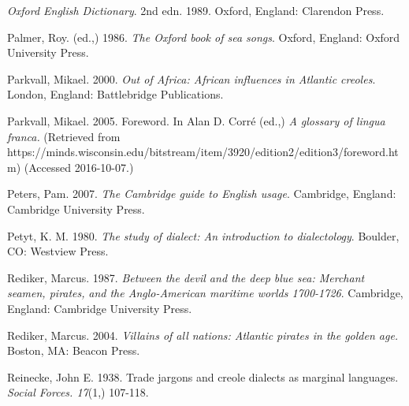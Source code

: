 \begin{styleStandard}
\textit{Oxford English Dictionary}. 2nd edn. 1989. Oxford, England: Clarendon Press. 
\end{styleStandard}

\begin{styleStandard}
Palmer, Roy. (ed.,) 1986. \textit{The Oxford book of sea songs}. Oxford, England: Oxford University Press. 
\end{styleStandard}

\begin{styleStandard}
Parkvall, Mikael. 2000. \textit{Out of Africa: African influences in Atlantic creoles}. London, England: Battlebridge Publications.
\end{styleStandard}

\begin{styleStandard}
Parkvall, Mikael. 2005. Foreword. In Alan D. Corré (ed.,) \textit{A glossary of lingua franca. }(Retrieved from https://minds.wisconsin.edu/bitstream/item/3920/edition2/edition3/foreword.htm) (Accessed 2016-10-07.)
\end{styleStandard}

\begin{styleStandard}
Peters, Pam. 2007. \textit{The Cambridge guide to English usage}. Cambridge, England: Cambridge University Press.
\end{styleStandard}

\begin{styleStandard}
Petyt, K. M. 1980. \textit{The study of dialect: An introduction to dialectology}. Boulder, CO: Westview Press.
\end{styleStandard}

\begin{styleStandard}
Rediker, Marcus. 1987. \textit{Between the devil and the deep blue sea: Merchant seamen, pirates,} \textit{and the Anglo-American maritime worlds 1700-1726}. Cambridge, England:\textit{ }Cambridge University Press. 
\end{styleStandard}

\begin{styleStandard}
Rediker, Marcus. 2004. \textit{Villains of all nations: Atlantic pirates in the golden age. }Boston, MA: Beacon Press.
\end{styleStandard}

\begin{styleStandard}
Reinecke, John E. 1938. Trade jargons and creole dialects as marginal languages. \textit{Social Forces. 17}(1,) 107-118. 
\end{styleStandard}

